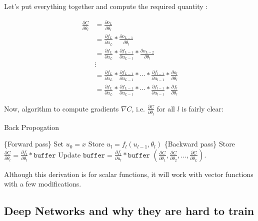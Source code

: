 \documentclass[a4paper]{tufte-handout}
\begin{document}
\noindent Let's put everything together and compute the required quantity
:

\begin{align*}
\frac{\partial C}{\partial \theta_l} &= \frac{\partial o_L}{\partial \theta_l}\\
&= \frac{\partial f_L}{\partial u_L} * \frac{\partial o_{L-1}}{\partial \theta_l}\\
&= \frac{\partial f_L}{\partial u_L} * \frac{\partial f_{L-1}}{\partial u_{L-1}} * \frac{\partial o_{L-2}}{\partial \theta_l} \\
&\vdots \\
&= \frac{\partial f_L}{\partial u_L} * \frac{\partial f_{L-1}}{\partial u_{L-1}} * \cdots * \frac{\partial f_{l-1}}{\partial u_{l-1}} * \frac{\partial o_l}{\partial \theta_l}\\
&= \frac{\partial f_L}{\partial u_L} * \frac{\partial f_{L-1}}{\partial u_{L-1}} * \cdots * \frac{\partial f_{l-1}}{\partial u_{l-1}} * \frac{\partial f_l}{\partial \theta_l}
\end{align*}

Now, algorithm to compute gradients \(\nabla C\), i.e.
\(\frac{\partial C}{\partial \theta_l}\) for all \(l\) is fairly clear:

\begin{algorithm}[H]
\caption{Back Propogation}
\begin{algorithmic}[1]
  \STATE \{Forward pass\}
  \STATE Set \(u_0 = x\)
  	\STATE Store \(u_l = f_l(u_{l-1}, \theta_l)\)
  \ENDFOR
  \STATE \{Backward pass\}
  	\STATE Store \(\frac{\partial C}{\partial \theta_l} = \frac{\partial f_l}{\partial \theta_l} * \texttt{buffer}\)
  	\STATE Update \(\texttt{buffer} = \frac{\partial f_l}{\partial u_l} * \texttt{buffer}\)
  \ENDFOR 
  \RETURN \(\left(\frac{\partial C}{\partial\theta_1}, \frac{\partial C}{\partial\theta_2}, \ldots, \frac{\partial C}{\partial\theta_L}\right)\).
\end{algorithmic}
\end{algorithm}


Although this derivation is for scalar functions, it will work with
vector functions with a few modifications.

\subsection{Deep Networks and why they are hard to train}\label{deep-neural-networks}
\end{document}
